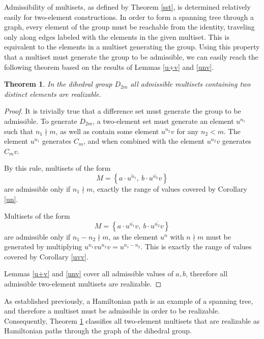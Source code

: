 \documentclass[12pt]{article}
\newtheorem{thm}{Theorem}[section]
\newcommand{\setof}[1]{\left\{#1\right\}}
\newcommand{\ol}[1]{\overline{#1}} %
\begin{document}
Admissibility of multisets, as defined by Theorem \ref{sst}, is determined relatively easily
for two-element constructions. In order to form a spanning tree through a graph, every
element of the group must be reachable from the identity, traveling only along edges labeled
with the elements in the given multiset. This is equivalent to the elements in a multiset
generating the group. Using this property that a multiset must generate the group to be
admissible, we can easily reach the following theorem based on the results of
Lemmas \ref{u+v} and \ref{unv}.

\begin{thm} \label{two} In the dihedral group $D_{2m}$ all admissible multisets
  containing two distinct elements are realizable.
\end{thm}

\begin{proof}
  It is trivially true that a difference set must generate the group to be admissible.
  To generate $D_{2m}$, a two-element set must generate an element $u^{n_1}$
  such that $n_1 \nmid m$, as well as contain some element $u^{n_2}v$ for any $n_2 < m$.
  The element $u^{n_1}$ generates $C_m$, and when combined with the element $u^{n_2}v$
  generates $C_mv$.

  By this rule, multisets of the form
  $$M = \setof{a \cdot \ol{u^{n_1}},\ b \cdot \ol{u^{n_2}v}}$$
  are admissible only if $n_1 \nmid m$, exactly the range of values covered by
  Corollary \ref{un}.

  Multisets of the form
  $$M = \setof{a \cdot \ol{u^{n_1}v},\ b \cdot \ol{u^{n_2}v}}$$
  are admissible only if $n_1 - n_2 \nmid m$, as the element $u^n$ with $n \nmid m$ must be
  generated by multiplying $u^{n_1}vu^{n_2}v = u^{n_1 - n_2}$. This is exactly the range of
  values covered by Corollary \ref{uvv}.

  Lemmas \ref{u+v} and \ref{unv} cover all admissible values of $a, b$, therefore
  all admissible two-element multisets are realizable.
\end{proof}

As established previously, a Hamiltonian path is an example of a spanning tree,
and therefore a multiset must be admissible in order to be realizable. Consequently,
Theorem \ref{two} classifies all two-element multisets that are realizable as Hamiltonian
paths through the graph of the dihedral group.
\end{document}
